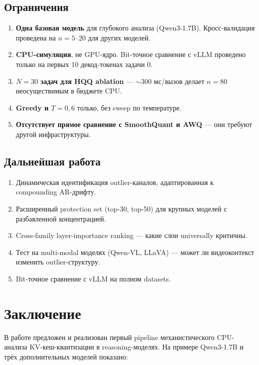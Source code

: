 \documentclass[a4paper,12pt]{article}
\begin{document}
\subsection{Ограничения}

\begin{enumerate}[label=\arabic*.,leftmargin=*]
\item \textbf{Одна базовая модель} для глубокого анализа (Qwen3-1.7B). Кросс-валидация проведена на $n=5$--20 для других моделей.
\item \textbf{CPU-симуляция}, не GPU-ядро. Bit-точное сравнение с vLLM проведено только на первых 10 декод-токенах задачи 0.
\item \textbf{$N = 30$ задач для HQQ ablation} --- $\sim$300 мс/вызов делает $n=80$ неосуществимым в бюджете CPU.
\item \textbf{Greedy и $T=0{,}6$} только, без sweep по температуре.
\item \textbf{Отсутствует прямое сравнение с SmoothQuant и AWQ} --- они требуют другой инфраструктуры.
\end{enumerate}

\subsection{Дальнейшая работа}

\begin{enumerate}[label=\arabic*.,leftmargin=*]
\item Динамическая идентификация outlier-каналов, адаптированная к compounding AR-дрифту.
\item Расширенный protection set (top-30, top-50) для крупных моделей с разбавленной концентрацией.
\item Cross-family layer-importance ranking --- какие слои universally критичны.
\item Тест на multi-modal моделях (Qwen-VL, LLaVA) --- может ли видеоконтекст изменить outlier-структуру.
\item Bit-точное сравнение с vLLM на полном datasets.
\end{enumerate}

\section{Заключение}

В работе предложен и реализован первый pipeline механистического CPU-анализа KV-кеш-квантизации в reasoning-моделях. На примере Qwen3-1.7B и трёх дополнительных моделей показано:
\end{document}
